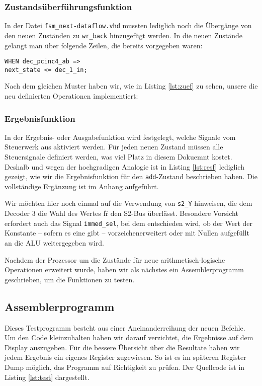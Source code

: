 \documentclass[12pt,a4paper]{scrartcl}
\begin{document}
\subsubsection*{Zustands\"uberf\"uhrungsfunktion}
In der Datei \texttt{fsm\_next-dataflow.vhd} mussten lediglich noch die \"Uberg\"ange von den neuen Zust\"anden zu \texttt{wr\_back} hinzugef\"ugt werden.
In die neuen Zust\"ande gelangt man \"uber folgende Zeilen, die bereits vorgegeben waren:
\begin{lstlisting}
WHEN dec_pcinc4_ab =>
next_state <= dec_1_in;
\end{lstlisting}

Nach dem gleichen Muster haben wir, wie in Listing \ref{lst:zuef} zu sehen, unsere die neu definierten Operationen implementiert:


\subsubsection*{Ergebnisfunktion}
In der Ergebnis- oder Ausgabefunktion wird festgelegt, welche Signale vom Steuerwerk aus aktiviert werden.
F\"ur jeden neuen Zustand m\"ussen alle Steuersignale definiert werden, was viel Platz in diesem Dokuemnt kostet.
Deshalb und wegen der hochgradigen Analogie ist in Listing \ref{lst:resf} lediglich gezeigt, wie wir die Ergebnisfunktion f\"ur den \texttt{add}-Zustand beschrieben haben.
Die vollst\"andige Erg\"anzung ist im Anhang aufgef\"uhrt.


Wir m\"ochten hier noch einmal auf die Verwendung von \texttt{s2\_Y} hinweisen, die dem Decoder 3 die Wahl des Wertes f\"r den S2-Bus \"uberl\"asst.
Besondere Vorsicht erfordert auch das Signal \texttt{immed\_sel}, bei dem entschieden wird, ob der Wert der Konstante -- sofern es eine gibt -- vorzeichenerweitert oder mit Nullen aufgef\"ullt an die ALU weitergegeben wird.

Nachdem der Prozessor um die Zust\"ande f\"ur neue arithmetisch-logische Operationen erweitert wurde, haben wir als n\"achstes ein Assemblerprogramm geschrieben, um die Funktionen zu testen.

\subsection*{Assemblerprogramm}
Dieses Testprogramm besteht aus einer Aneinanderreihung der neuen Befehle.
Um den Code kleinzuhalten haben wir darauf verzichtet, die Ergebnisse auf dem Display auszugeben.
F\"ur die bessere \"Ubersicht \"uber die Resultate haben wir jedem Ergebnis ein eigenes Register zugewiesen.
So ist es im sp\"ateren Register Dump m\"oglich, das Programm auf Richtigkeit zu pr\"ufen.
Der Quellcode ist in Listing \ref{lst:test} dargestellt.

\end{document}
